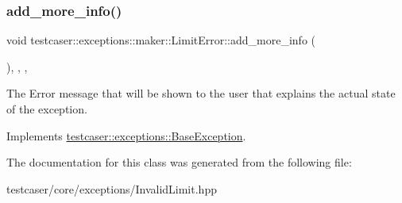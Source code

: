 \subsubsection{\texorpdfstring{add\_more\_info()}{add\_more\_info()}}
{\footnotesize\ttfamily void testcaser\+::exceptions\+::maker\+::\+Limit\+Error\+::add\+\_\+more\+\_\+info (\begin{DoxyParamCaption}{ }\end{DoxyParamCaption})\hspace{0.3cm}{\ttfamily [inline]}, {\ttfamily [final]}, {\ttfamily [override]}, {\ttfamily [virtual]}}



The Error message that will be shown to the user that explains the actual state of the exception. 



Implements \mbox{\hyperlink{classtestcaser_1_1exceptions_1_1BaseException_ad607ea04e2cb4ad9b8d0e2e6b6734f2f}{testcaser\+::exceptions\+::\+Base\+Exception}}.



The documentation for this class was generated from the following file\+:\begin{DoxyCompactItemize}
\item 
testcaser/core/exceptions/Invalid\+Limit.\+hpp\end{DoxyCompactItemize}

